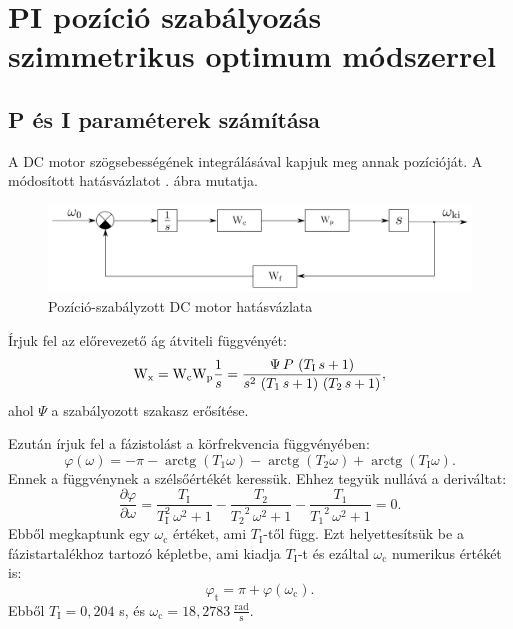 \section{PI pozíció szabályozás szimmetrikus optimum módszerrel}

\subsection{P és I paraméterek számítása}

A DC motor szögsebességének integrálásával kapjuk meg annak pozícióját.
A módosított hatásvázlatot . ábra mutatja.

\begin{figure}[H]
	\centering
	\includegraphics[width=.7\textwidth]{pi-hatasvazlat-2}
	\caption{Pozíció-szabályzott DC motor hatásvázlata}
	\label{fig:pi-hatasvazlat-2}
\end{figure}

Írjuk fel az előrevezető ág átviteli függvényét:
\begin{equation}
	\mathrm{W}_\text{x} = \mathrm{W}_\text{c}\mathrm{W}_\text{p}\frac{1}{s} = 
	\frac{\Psi\, P\, \left(T_\text{I}\, s + 1\right)}{s^2\, \left(T_1\, s + 1\right)\, \left(T_2\, s + 1\right)},
\end{equation}
ahol $\Psi$ a szabályozott szakasz erősítése.

Ezután írjuk fel a fázistolást a körfrekvencia függvényében:
\begin{equation}
	\varphi(\omega) = -\pi - \operatorname{arctg}(T_1\omega) - \operatorname{arctg}(T_2\omega) + \operatorname{arctg}(T_\text{I}\omega).
\end{equation}
Ennek a függvénynek a szélsőértékét keressük. Ehhez tegyük nullává a deriváltat:
\begin{equation}
	\frac{\partial\varphi}{\partial\omega} = 
	\frac{T_\text{I}}{T_\text{I}^2\, \omega^2 + 1} - \frac{T_2}{{T_2}^2\, \omega^2 + 1} - \frac{T_1}{{T_1}^2\, \omega^2 + 1} = 0.
\end{equation}
Ebből megkaptunk egy $\omega_\text{c}$ értéket, ami $T_\text{I}$-től függ.
Ezt helyettesítsük be a fázistartalékhoz tartozó képletbe, ami kiadja $T_\text{I}$-t és
ezáltal $\omega_\text{c}$ numerikus értékét is:
\begin{equation}
	\varphi_\text{t} = \pi + \varphi(\omega_\text{c}).
\end{equation}
Ebből $T_\text{I} = 0,204$ s, és $\omega_\text{c} = 18,2783~\frac{\text{rad}}{\text{s}}$.

